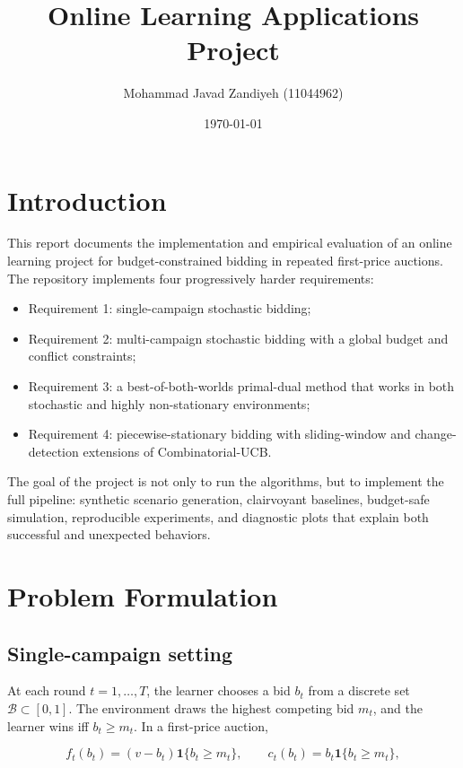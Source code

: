 \documentclass[11pt,a4paper]{article}
\title{Online Learning Applications Project}
\author{Mohammad Javad Zandiyeh (11044962)}
\date{\today}
\begin{document}
\maketitle
\tableofcontents
\newpage

\section{Introduction}

This report documents the implementation and empirical evaluation of an online
learning project for budget-constrained bidding in repeated first-price
auctions. The repository implements four progressively harder requirements:

\begin{itemize}
  \item Requirement 1: single-campaign stochastic bidding;
  \item Requirement 2: multi-campaign stochastic bidding with a global budget and
  conflict constraints;
  \item Requirement 3: a best-of-both-worlds primal-dual method that works in
  both stochastic and highly non-stationary environments;
  \item Requirement 4: piecewise-stationary bidding with sliding-window and
  change-detection extensions of Combinatorial-UCB.
\end{itemize}

The goal of the project is not only to run the algorithms, but to implement the
full pipeline: synthetic scenario generation, clairvoyant baselines, budget-safe
simulation, reproducible experiments, and diagnostic plots that explain both
successful and unexpected behaviors.

\section{Problem Formulation}

\subsection{Single-campaign setting}

At each round $t=1,\dots,T$, the learner chooses a bid $b_t$ from a discrete set
$\mathcal{B} \subset [0,1]$. The environment draws the highest competing bid
$m_t$, and the learner wins iff $b_t \ge m_t$. In a first-price auction,

\[
f_t(b_t) = (v - b_t)\mathbf{1}\{b_t \ge m_t\},
\qquad
c_t(b_t) = b_t \mathbf{1}\{b_t \ge m_t\},
\]
\end{document}
